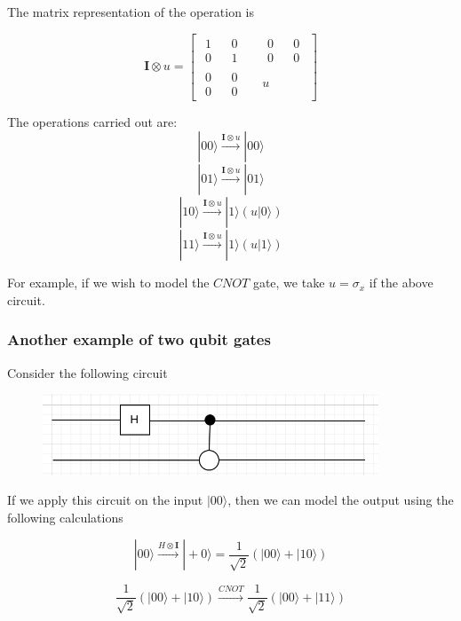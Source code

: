 \documentclass{article}
\begin{document}
The matrix representation of the operation is

$$
    \mathbf{I} \otimes u = \begin{bmatrix}
        \begin{matrix}
            1 && 0\\
            0 && 1
        \end{matrix}
        && 
        \begin{matrix}
            0 && 0\\
            0 && 0
        \end{matrix}
        \\
        \begin{matrix}
            0 && 0\\
            0 && 0
        \end{matrix}
        && 
        u
    \end{bmatrix}
$$

The operations carried out are:
$$|00\rangle \xrightarrow[]{\mathbf{I} \otimes u} |00\rangle$$
$$|01\rangle \xrightarrow[]{\mathbf{I} \otimes u} |01\rangle$$
$$|10\rangle \xrightarrow[]{\mathbf{I} \otimes u} |1\rangle(u|0\rangle)$$
$$|11\rangle \xrightarrow[]{\mathbf{I} \otimes u} |1\rangle(u|1\rangle)$$

For example, if we wish to model the $CNOT$ gate, we take $u=\sigma _x$ if the above circuit.

\subsubsection{Another example of two qubit gates}

Consider the following circuit

\begin{figure}[htp]
    \centering
    \includegraphics[width=10cm]{extwoqubit.png}
\end{figure}

If we apply this circuit on the input $|00\rangle$, then we can model the output using the following calculations

$$|00\rangle \xrightarrow[]{H \otimes \mathbf{I}} |+0\rangle = \frac{1}{\sqrt{2}}(|00\rangle + |10\rangle)$$

$$\frac{1}{\sqrt{2}}(|00\rangle + |10\rangle) \xrightarrow[]{CNOT} \frac{1}{\sqrt{2}}(|00\rangle + |11\rangle)$$
\end{document}
